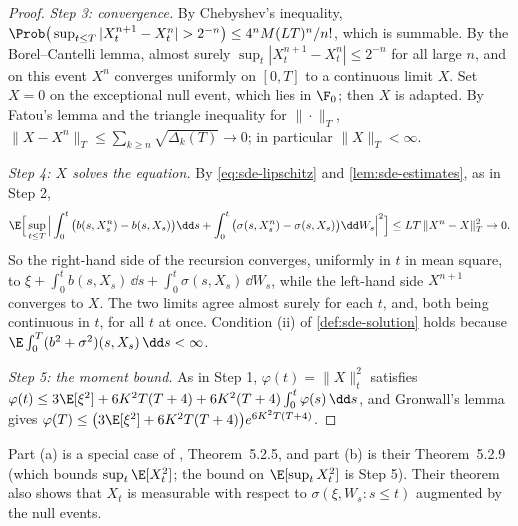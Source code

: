 \begin{proof}
\emph{Step 3: convergence.} By Chebyshev's inequality,
$\Prob\big(\sup_{t\le T}|X^{n+1}_t-X^n_t|>2^{-n}\big)\le4^nM(LT)^n/n!$, which is summable.
By the Borel--Cantelli lemma, almost surely $\sup_t|X^{n+1}_t-X^n_t|\le2^{-n}$ for all large
$n$, and on this event $X^n$ converges uniformly on $[0,T]$ to a continuous limit $X$. Set
$X=0$ on the exceptional null event, which lies in $\F_0$; then $X$ is adapted. By Fatou's
lemma and the triangle inequality for $\|\cdot\|_T$,
$\|X-X^n\|_T\le\sum_{k\ge n}\sqrt{\Delta_k(T)}\to0$; in particular $\|X\|_T<\infty$.

\emph{Step 4: $X$ solves the equation.} By \eqref{eq:sde-lipschitz} and
\cref{lem:sde-estimates}, as in Step 2,
\[
  \E\Big[\sup_{t\le T}\Big|\int_0^t\big(b(s,X^n_s)-b(s,X_s)\big)\dd s
  +\int_0^t\big(\sigma(s,X^n_s)-\sigma(s,X_s)\big)\dd W_s\Big|^2\Big]\le LT\,\|X^n-X\|_T^2\to0 .
\]
So the right-hand side of the recursion converges, uniformly in $t$ in mean square, to
$\xi+\int_0^tb(s,X_s)\,\dd s+\int_0^t\sigma(s,X_s)\,\dd W_s$, while the left-hand side
$X^{n+1}$ converges to $X$. The two limits agree almost surely for each $t$, and, both being
continuous in $t$, for all $t$ at once. Condition (ii) of \cref{def:sde-solution} holds
because $\E\int_0^T(b^2+\sigma^2)(s,X_s)\,\dd s<\infty$.

\emph{Step 5: the moment bound.} As in Step 1, $\varphi(t)=\|X\|_t^2$ satisfies
$\varphi(t)\le3\E[\xi^2]+6K^2T(T+4)+6K^2(T+4)\int_0^t\varphi(s)\,\dd s$, and Gronwall's lemma
gives $\varphi(T)\le\big(3\E[\xi^2]+6K^2T(T+4)\big)e^{6K^2T(T+4)}$.
\end{proof}

Part (a) is a special case of \textcite{karatzas-shreve}, Theorem~5.2.5, and part (b) is
their Theorem~5.2.9 (which bounds $\sup_t\E[X_t^2]$; the bound on $\E[\sup_tX_t^2]$ is
Step 5). Their theorem also shows that $X_t$ is measurable with respect to
$\sigma(\xi,W_s:s\le t)$ augmented by the null events.

